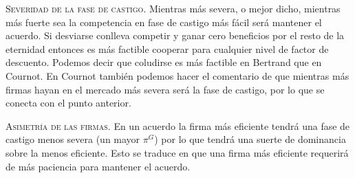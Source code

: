 \textsc{Severidad de la fase de castigo}. Mientras más severa, o mejor dicho, mientras más fuerte sea la competencia en fase de castigo más fácil será mantener el acuerdo. Si desviarse conlleva competir y ganar cero beneficios por el resto de la eternidad entonces es más factible cooperar para cualquier nivel de factor de descuento. Podemos decir que coludirse es más factible en Bertrand que en Cournot. En Cournot también podemos hacer el comentario de que mientras más firmas hayan en el mercado más severa será la fase de castigo, por lo que se conecta con el punto anterior. 

\textsc{Asimetría de las firmas}. En un acuerdo la firma más eficiente tendrá una fase de castigo menos severa (un mayor $\pi^G$) por lo que tendrá una suerte de dominancia sobre la menos eficiente. Esto se traduce en que una firma más eficiente requerirá de más paciencia para mantener el acuerdo. 